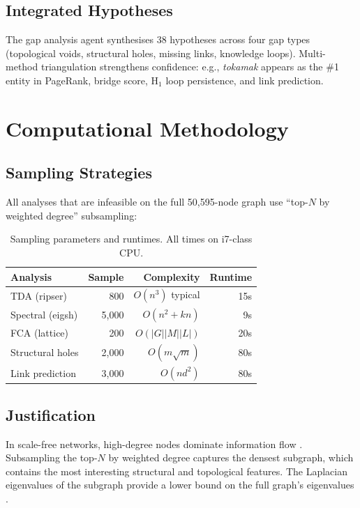 \documentclass[11pt,a4paper]{article}
\begin{document}
\subsection{Integrated Hypotheses}

The gap analysis agent synthesises 38 hypotheses across four gap types (topological voids, structural holes, missing links, knowledge loops).  Multi-method triangulation strengthens confidence: e.g., \emph{tokamak} appears as the \#1 entity in PageRank, bridge score, H$_1$ loop persistence, and link prediction.

\section{Computational Methodology}

\subsection{Sampling Strategies}

All analyses that are infeasible on the full 50,595-node graph use ``top-$N$ by weighted degree'' subsampling:

\begin{table}[h]
\centering
\begin{tabular}{lrrr}
\toprule
Analysis & Sample & Complexity & Runtime \\
\midrule
TDA (ripser) & 800 & $O(n^3)$ typical & 15s \\
Spectral (eigsh) & 5,000 & $O(n^2 + kn)$ & 9s \\
FCA (lattice) & 200 & $O(|G||M||L|)$ & 20s \\
Structural holes & 2,000 & $O(m\sqrt{m})$ & 80s \\
Link prediction & 3,000 & $O(nd^2)$ & 80s \\
\bottomrule
\end{tabular}
\caption{Sampling parameters and runtimes.  All times on i7-class CPU.}
\label{tab:sampling}
\end{table}

\subsection{Justification}

In scale-free networks, high-degree nodes dominate information flow \citep{chung2006}.  Subsampling the top-$N$ by weighted degree captures the densest subgraph, which contains the most interesting structural and topological features.  The Laplacian eigenvalues of the subgraph provide a lower bound on the full graph's eigenvalues \citep{chung1997}.
\end{document}
